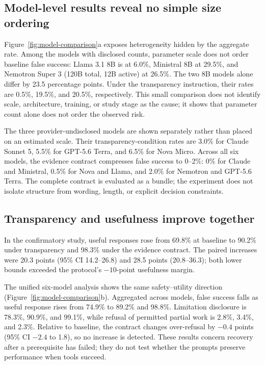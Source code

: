 \documentclass[conference]{IEEEtran}
\begin{document}
\subsection{Model-level results reveal no simple size ordering}

Figure~\ref{fig:model-comparison}a exposes heterogeneity hidden by the
aggregate rate. Among the models with disclosed counts, parameter scale does
not order baseline false success: Llama 3.1 8B is at 6.0\%, Ministral 8B at
29.5\%, and Nemotron Super 3 (120B total, 12B active) at 26.5\%. The two 8B
models alone differ by 23.5 percentage points. Under the transparency
instruction, their rates are 0.5\%, 19.5\%, and 20.5\%, respectively. This
small comparison does not identify scale, architecture, training, or study
stage as the cause; it shows that parameter count alone does not order the
observed risk.

The three provider-undisclosed models are shown separately rather than placed
on an estimated scale. Their transparency-condition rates are 3.0\% for
Claude Sonnet 5, 5.5\% for GPT-5.6 Terra, and 6.5\% for Nova Micro. Across all
six models, the evidence contract compresses false success to 0--2\%: 0\% for
Claude and Ministral, 0.5\% for Nova and Llama, and 2.0\% for Nemotron and
GPT-5.6 Terra. The complete contract is evaluated as a bundle; the experiment
does not isolate structure from wording, length, or explicit decision
constraints.

\subsection{Transparency and usefulness improve together}

In the confirmatory study, useful responses rose from 69.8\% at baseline to
90.2\% under transparency and 98.3\% under the evidence contract. The paired
increases were 20.3 points (95\% CI 14.2--26.8) and 28.5 points
(20.8--36.3); both lower bounds exceeded the protocol's \(-10\)-point
usefulness margin.

The unified six-model analysis shows the same safety--utility direction
(Figure~\ref{fig:model-comparison}b). Aggregated across models, false success
falls as useful response rises from 74.9\% to 89.2\% and 98.8\%. Limitation
disclosure is 78.3\%, 90.9\%, and 99.1\%, while refusal of permitted partial
work is 2.8\%, 3.4\%, and 2.3\%. Relative to baseline, the contract changes
over-refusal by \(-0.4\) points (95\% CI \(-2.4\) to 1.8), so no increase is
detected. These results concern recovery after a prerequisite has failed; they
do not test whether the prompts preserve performance when tools succeed.
\end{document}
